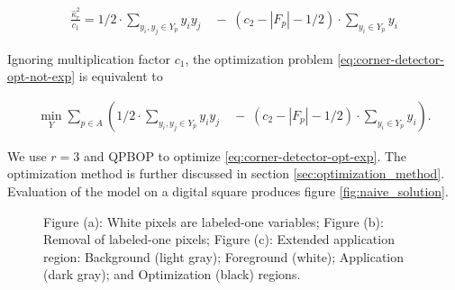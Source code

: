 \documentclass[runningheads]{llncs}
\begin{document}
	\begin{align*}
		\frac{\hat{\kappa}_{r}^2}{c_1} =1/2 \cdot \sum_{ y_i,y_j \in Y_{p} }{y_iy_j} \quad  - \;(c_2-|F_p|-1/2)\cdot \sum_{y_i \in Y_{p}}{y_i}
	\end{align*}

	Ignoring multiplication factor $c_1$, the optimization problem \eqref{eq:corner-detector-opt-not-exp} is equivalent to
	
\begin{align}			
	\min_{Y} \sum_{p \in A}\left( { 1/2 \cdot \sum_{ y_i,y_j \in Y_{p} }{y_iy_j} \quad  - \;(c_2-|F_p|-1/2)\cdot \sum_{y_i \in Y_{p}}{y_i} } \right).
	\label{eq:corner-detector-opt-exp}
\end{align}

We use $r=3$ and QPBOP to optimize \eqref{eq:corner-detector-opt-exp}. The optimization method is further discussed in section \ref{sec:optimization_method}. Evaluation of the model on a digital square produces figure \ref{fig:naive_solution}.


	\begin{figure}[!ht]
		\center
		\hspace{40pt}
		\hspace{40pt}
		\caption{Figure (a): White pixels are labeled-one variables; Figure (b): Removal of labeled-one pixels; Figure (c): Extended application region: Background (light gray); Foreground (white); Application (dark gray); and Optimization (black) regions.}	
					
	\end{figure}
\end{document}
